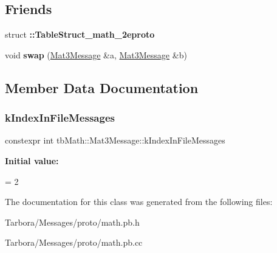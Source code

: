 \subsection*{Friends}
\begin{DoxyCompactItemize}
\item 
\mbox{\label{classtbMath_1_1Mat3Message_a016291c3138deb3d18455a730e2da9b1}} 
struct {\bfseries \+::\+Table\+Struct\+\_\+math\+\_\+2eproto}
\item 
\mbox{\label{classtbMath_1_1Mat3Message_a38724d1a420cfd61e96844740ef718a0}} 
void {\bfseries swap} (\hyperlink{classtbMath_1_1Mat3Message}{Mat3\+Message} \&a, \hyperlink{classtbMath_1_1Mat3Message}{Mat3\+Message} \&b)
\end{DoxyCompactItemize}


\subsection{Member Data Documentation}
\mbox{\label{classtbMath_1_1Mat3Message_a627ce4f462ea7604209d51b487f9653f}} 
\subsubsection{\texorpdfstring{k\+Index\+In\+File\+Messages}{kIndexInFileMessages}}
{\footnotesize\ttfamily constexpr int tb\+Math\+::\+Mat3\+Message\+::k\+Index\+In\+File\+Messages\hspace{0.3cm}{\ttfamily [static]}}

{\bfseries Initial value\+:}
\begin{DoxyCode}
=
    2
\end{DoxyCode}


The documentation for this class was generated from the following files\+:\begin{DoxyCompactItemize}
\item 
Tarbora/\+Messages/proto/math.\+pb.\+h\item 
Tarbora/\+Messages/proto/math.\+pb.\+cc\end{DoxyCompactItemize}
